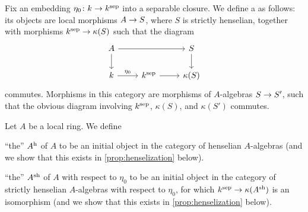 \documentclass[a4paper, 10pt, oneside, DIV=9, chapterprefix=true, numbers=enddot, bibliography=totoc]{scrbook}
\begin{document}
Fix an embedding $\eta_0\colon k\morphism k^\sep$ into a separable closure. We define a  as follows: its objects are local morphisms $A\morphism S$, where $S$ is strictly henselian, together with morphisms $k^\sep\morphism \kappa(S)$ such that the diagram
\begin{equation*}
	\begin{tikzcd}
		A\dar \ar[rr] & & S\dar\\
		k \rar["\eta_0"]&k^\sep\rar & \kappa(S)
	\end{tikzcd}
\end{equation*}
commutes. Morphisms in this category are morphisms of $A$-algebras $S\morphism S'$, such that the obvious diagram involving $k^{\mathrm{sep}}$, $\kappa(S)$, and $\kappa(S')$ commutes.
\begin{defi}\label{def:henselization}
	Let $A$ be a local ring. We define
	\begin{alphanumerate}
		\item \enquote{the}  $A^{\mathrm{h}}$ of $A$ to be an initial object in the category of henselian $A$-algebras (and we show that this exists in \cref{prop:henselization} below).
		\item \enquote{the}  $A^{\mathrm{sh}}$ of $A$ with respect to $\eta_0$ to be an initial object in the category of strictly henselian $A$-algebras with respect to $\eta_0$, for which $k^\sep\morphism \kappa(A^\sh)$ is an isomorphism (and we show that this exists in \cref{prop:henselization} below).
	\end{alphanumerate}
\end{defi}
\end{document}
